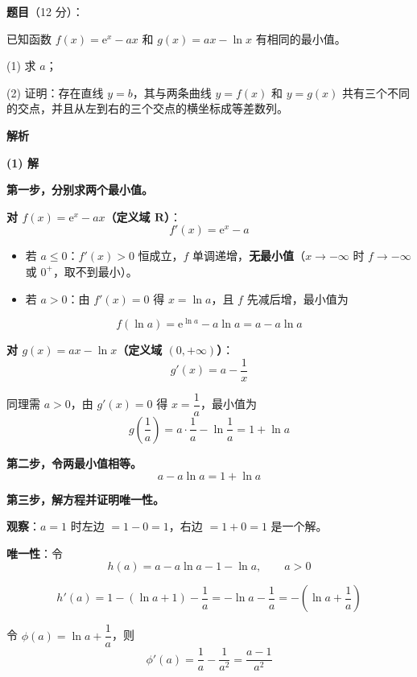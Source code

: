 \begin{answer}

\textbf{题目}（12 分）：

已知函数 $f(x)=\mathrm e^{x}-ax$ 和 $g(x)=ax-\ln x$ 有相同的最小值。

  (1) 求 $a$；

  (2) 证明：存在直线 $y=b$，其与两条曲线 $y=f(x)$ 和 $y=g(x)$ 共有三个不同的交点，并且从左到右的三个交点的横坐标成等差数列。

\par\medskip

\textbf{解析}

\par\medskip

\textbf{(1) 解}

\textbf{第一步，分别求两个最小值。}

\textbf{对 $f(x)=\mathrm e^{x}-ax$（定义域 $\mathbf R$）}：
\nopagebreak[4]
\[f'(x)=\mathrm e^{x}-a\]

\begin{itemize}
\item 若 $a\le0$：$f'(x)>0$ 恒成立，$f$ 单调递增，\textbf{无最小值}（$x\to-\infty$ 时 $f\to-\infty$ 或 $0^{+}$，取不到最小）。
\item 若 $a>0$：由 $f'(x)=0$ 得 $x=\ln a$，且 $f$ 先减后增，最小值为
\end{itemize}
\nopagebreak[4]
\[f(\ln a)=\mathrm e^{\ln a}-a\ln a=a-a\ln a\]

\textbf{对 $g(x)=ax-\ln x$（定义域 $(0,+\infty)$）}：
\nopagebreak[4]
\[g'(x)=a-\frac1x\]

同理需 $a>0$，由 $g'(x)=0$ 得 $x=\dfrac1a$，最小值为
\nopagebreak[4]
\[g\left(\frac1a\right)=a\cdot\frac1a-\ln\frac1a=1+\ln a\]

\textbf{第二步，令两最小值相等。}
\nopagebreak[4]
\[a-a\ln a=1+\ln a\]

\textbf{第三步，解方程并证明唯一性。}

\textbf{观察}：$a=1$ 时左边 $=1-0=1$，右边 $=1+0=1$  是一个解。

\textbf{唯一性}：令
\nopagebreak[4]
\[h(a)=a-a\ln a-1-\ln a,\qquad a>0\]

\nopagebreak[4]
\[h'(a)=1-\left(\ln a+1\right)-\frac1a=-\ln a-\frac1a=-\left(\ln a+\frac1a\right)\]

令 $\phi(a)=\ln a+\dfrac1a$，则
\nopagebreak[4]
\[\phi'(a)=\frac1a-\frac1{a^{2}}=\frac{a-1}{a^{2}}\]


\end{answer}
